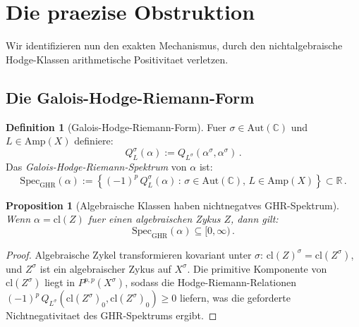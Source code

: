 \documentclass[aps,prd,twocolumn,superscriptaddress,nofootinbib]{revtex4-2}
\newtheorem{proposition}[theorem]{Proposition}
\theoremstyle{definition}
\newtheorem{definition}[theorem]{Definition}
\theoremstyle{remark}
\begin{document}
\section{Die praezise Obstruktion}
\label{sec:obstruction}

Wir identifizieren nun den exakten Mechanismus, durch den nichtalgebraische Hodge-Klassen arithmetische Positivitaet verletzen.

\subsection{Die Galois-Hodge-Riemann-Form}

\begin{definition}[Galois-Hodge-Riemann-Form]
\label{def:galois_HR}
Fuer $\sigma \in \mathrm{Aut}(\mathbb{C})$ und $L \in \mathrm{Amp}(X)$ definiere:
\begin{equation}
Q_L^\sigma(\alpha) := Q_{L^\sigma}(\alpha^\sigma, \alpha^\sigma)\,.
\label{eq:galois_HR}
\end{equation}
Das \textit{Galois-Hodge-Riemann-Spektrum} von $\alpha$ ist:
\begin{equation}
\mathrm{Spec}_{\mathrm{GHR}}(\alpha) := \left\{ (-1)^p\, Q_L^\sigma(\alpha) \,:\, \sigma \in \mathrm{Aut}(\mathbb{C}),\, L \in \mathrm{Amp}(X) \right\} \subset \mathbb{R}\,.
\end{equation}
\end{definition}

\begin{proposition}[Algebraische Klassen haben nichtnegatves GHR-Spektrum]
\label{prop:ghr_positive}
Wenn $\alpha = \mathrm{cl}(Z)$ fuer einen algebraischen Zykus $Z$, dann gilt:
\begin{equation}
\mathrm{Spec}_{\mathrm{GHR}}(\alpha) \subseteq [0, \infty)\,.
\end{equation}
\end{proposition}

\begin{proof}
Algebraische Zykel transformieren kovariant unter $\sigma$: $\mathrm{cl}(Z)^\sigma = \mathrm{cl}(Z^\sigma)$, und $Z^\sigma$ ist ein algebraischer Zykus auf $X^\sigma$. Die primitive Komponente von $\mathrm{cl}(Z^\sigma)$ liegt in $P^{p,p}(X^\sigma)$, sodass die Hodge-Riemann-Relationen $(-1)^p\, Q_{L^\sigma}(\mathrm{cl}(Z^\sigma)_0, \mathrm{cl}(Z^\sigma)_0) \geq 0$ liefern, was die geforderte Nichtnegativitaet des GHR-Spektrums ergibt.
\end{proof}
\end{document}
